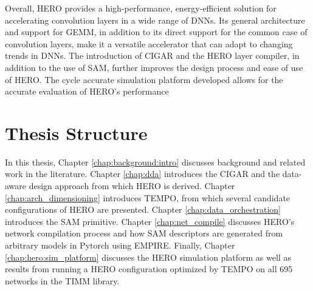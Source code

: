 Overall, HERO provides a high-performance, energy-efficient solution for
accelerating convolution layers in a wide range of DNNs. Its general
architecture and support for GEMM, in addition to its direct support for the
common case of convolution layers, make it a versatile accelerator that can
adapt to changing trends in DNNs. The introduction of CIGAR and the HERO layer
compiler, in addition to the use of SAM, further improves the design process and
ease of use of HERO. The cycle accurate simulation platform developed allows for
the accurate evaluation of HERO's performance


\section{Thesis Structure}
\label{chap:intro:thesis_structure}


In this thesis, Chapter \ref{chap:background:intro} discusses background and
related work in the literature. Chapter \ref{chap:dda} introduces the CIGAR and
the data-aware design approach from which HERO is derived. Chapter
\ref{chap:arch_dimensioning} introduces TEMPO, from which several candidate
configurations of HERO are presented. Chapter \ref{chap:data_orchestration}
introduces the SAM primitive. Chapter \ref{chap:net_compile} discusses HERO's
network compilation process and how SAM descriptors are generated from arbitrary
models in Pytorch using EMPIRE. Finally, Chapter \ref{chap:hero:sim_platform}
discusses the HERO simulation platform as well as results from running a HERO
configuration optimized by TEMPO on all 695 networks in the TIMM library.